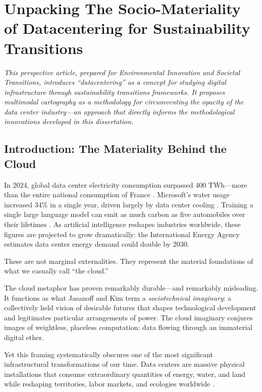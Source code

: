 \documentclass[../../main.tex]{subfiles}
\begin{document}
\chapter{Unpacking The Socio-Materiality of Datacentering for Sustainability Transitions}

\begin{fullwidthpar}
\textit{This perspective article, prepared for Environmental Innovation and Societal Transitions, introduces ``datacentering'' as a concept for studying digital infrastructure through sustainability transitions frameworks. It proposes multimodal cartography as a methodology for circumventing the opacity of the data center industry---an approach that directly informs the methodological innovations developed in this dissertation.}
\end{fullwidthpar}

\section{Introduction: The Materiality Behind the Cloud}

In 2024, global data center electricity consumption surpassed 400 TWh---more than the entire national consumption of France . Microsoft's water usage increased 34\% in a single year, driven largely by data center cooling . Training a single large language model can emit as much carbon as five automobiles over their lifetimes . As artificial intelligence reshapes industries worldwide, these figures are projected to grow dramatically: the International Energy Agency estimates data center energy demand could double by 2030.

These are not marginal externalities. They represent the material foundations of what we casually call ``the cloud.''

\begin{kaobox}[title=The Cloud Imaginary]
The cloud metaphor has proven remarkably durable---and remarkably misleading. It functions as what Jasanoff and Kim term a \textit{sociotechnical imaginary}: a collectively held vision of desirable futures that shapes technological development and legitimates particular arrangements of power. The cloud imaginary conjures images of weightless, placeless computation: data flowing through an immaterial digital ether.
\end{kaobox}

Yet this framing systematically obscures one of the most significant infrastructural transformations of our time. Data centers are massive physical installations that consume extraordinary quantities of energy, water, and land while reshaping territories, labor markets, and ecologies worldwide .
\end{document}
